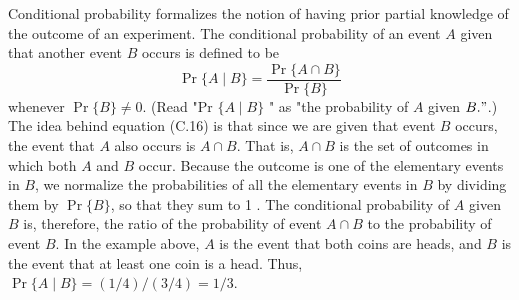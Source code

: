 \documentclass[lang=cn,newtx,10pt,scheme=chinese]{elegantbook}
\begin{document}
Conditional probability formalizes the notion of having prior partial knowledge of the outcome of an experiment. The conditional probability of an event $A$ given that another event $B$ occurs is defined to be
$$
\operatorname{Pr}\{A \mid B\}=\frac{\operatorname{Pr}\{A \cap B\}}{\operatorname{Pr}\{B\}}
$$
whenever $\operatorname{Pr}\{B\} \neq 0$. (Read "Pr $\{A \mid B\}$ " as "the probability of $A$ given $B . "$.) The idea behind equation (C.16) is that since we are given that event $B$ occurs, the event that $A$ also occurs is $A \cap B$. That is, $A \cap B$ is the set of outcomes in which both $A$ and $B$ occur. Because the outcome is one of the elementary events in $B$, we normalize the probabilities of all the elementary events in $B$ by dividing them by $\operatorname{Pr}\{B\}$, so that they sum to 1 . The conditional probability of $A$ given $B$ is, therefore, the ratio of the probability of event $A \cap B$ to the probability of event $B$. In the example above, $A$ is the event that both coins are heads, and $B$ is the event that at least one coin is a head. Thus, $\operatorname{Pr}\{A \mid B\}=(1 / 4) /(3 / 4)=1 / 3$.
\end{document}
